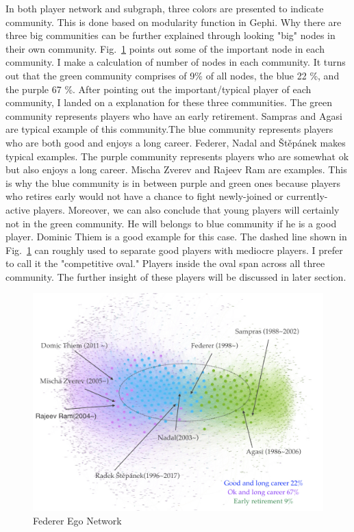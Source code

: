 \documentclass[runningheads]{llncs}
\begin{document}
In both player network and subgraph, three colors are presented to indicate community. This is done based on modularity function in Gephi. Why there are three big communities can be further explained through looking "big" nodes in their own community. Fig.~\ref{fig_2_player_pos} points out some of the important node in each community. I make a calculation of number of nodes in each community. It turns out that the green community comprises of 9\% of all nodes, the blue 22 \%, and the purple 67 \%. After pointing out the important/typical player of each community, I landed on a explanation for these three communities. The green community represents players who have an early retirement. Sampras and Agasi are typical example of this community.The blue community represents players who are both good and enjoys a long career. Federer, Nadal and Štěpánek makes typical examples. The purple community represents players who are somewhat ok but also enjoys a long career. Mischa Zverev and Rajeev Ram are examples. This is why the blue community is in between purple and green ones because players who retires early would not have a chance to fight newly-joined or currently-active players. Moreover, we can also conclude that young players will certainly not in the green community. He will belongs to blue community if he is a good player. Dominic Thiem is a good example for this case. The dashed line shown in Fig.~\ref{fig_2_player_pos} can roughly used to separate good players with mediocre players. I prefer to call it the "competitive oval." Players inside the oval span across all three community. The further insight of these players will be discussed in later section.




\begin{figure}[H]
\centering
\includegraphics[width=\textwidth]{2_player_pos}
\caption{Federer Ego Network} \label{fig_2_player_pos}
\end{figure}
\end{document}
